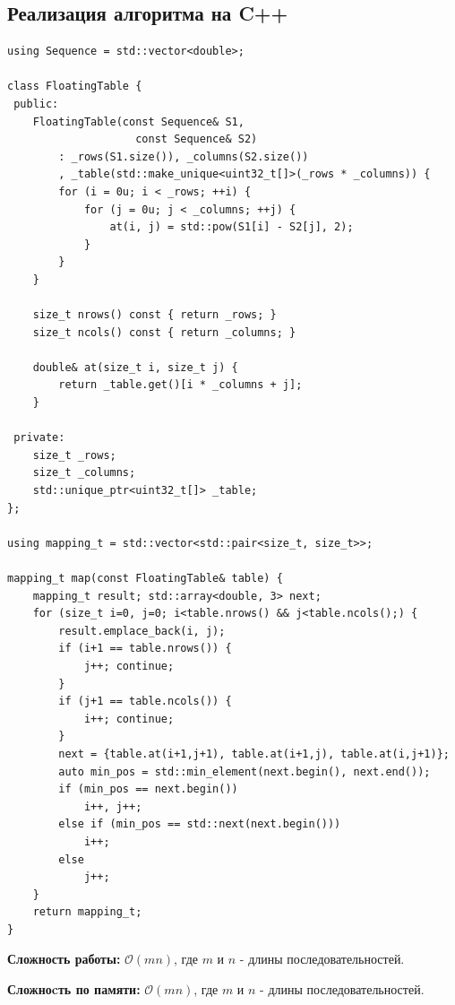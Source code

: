 \documentclass[12pt]{article}
\begin{document}
    \newpage
    \subsection{Реализация алгоритма на C++}
    \begin{lstlisting}
using Sequence = std::vector<double>;

class FloatingTable {
 public:
    FloatingTable(const Sequence& S1,
                    const Sequence& S2)
        : _rows(S1.size()), _columns(S2.size())
        , _table(std::make_unique<uint32_t[]>(_rows * _columns)) {
        for (i = 0u; i < _rows; ++i) {
            for (j = 0u; j < _columns; ++j) {
                at(i, j) = std::pow(S1[i] - S2[j], 2);
            }
        }
    }

    size_t nrows() const { return _rows; }
    size_t ncols() const { return _columns; }

    double& at(size_t i, size_t j) {
        return _table.get()[i * _columns + j];
    }

 private:
    size_t _rows;
    size_t _columns;
    std::unique_ptr<uint32_t[]> _table;
};

using mapping_t = std::vector<std::pair<size_t, size_t>>;

mapping_t map(const FloatingTable& table) {
    mapping_t result; std::array<double, 3> next;
    for (size_t i=0, j=0; i<table.nrows() && j<table.ncols();) {
        result.emplace_back(i, j);
        if (i+1 == table.nrows()) {
            j++; continue;
        }
        if (j+1 == table.ncols()) {
            i++; continue;
        }
        next = {table.at(i+1,j+1), table.at(i+1,j), table.at(i,j+1)};
        auto min_pos = std::min_element(next.begin(), next.end());
        if (min_pos == next.begin())
            i++, j++;
        else if (min_pos == std::next(next.begin()))
            i++;
        else
            j++;
    }
    return mapping_t;
}
    \end{lstlisting}

    \textbf{Сложность работы:} $\mathcal{O}(mn)$, где $m$ и $n$ - длины последовательностей.

    \textbf{Сложноcть по памяти:} $\mathcal{O}(mn)$, где $m$ и $n$ - длины последовательностей.

    \newpage
\end{document}
